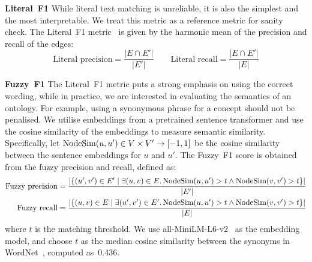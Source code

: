 \textbf{Literal~F1 }
While literal text matching is unreliable, it is also the simplest and the most interpretable. We treat this metric as a reference metric for sanity check. The Literal~F1 metric~\cite{Kashyap2005TaxaMinerAE} is given by the harmonic mean of the precision and recall of the edges:
\[
    \text{Literal precision} = \frac{|E \cap E'|}{|E'|} \qquad
    \text{Literal recall} = \frac{|E \cap E'|}{|E|}
\]

\textbf{Fuzzy~F1 }
The Literal~F1 metric puts a strong emphasis on using the correct wording, while in practice, we are interested in evaluating the semantics of an ontology. For example, using a synonymous phrase for a concept should not be penalised. We utilise embeddings from a pretrained sentence transformer \cite{reimers-2019-sentence-bert} and use the cosine similarity of the embeddings to measure semantic similarity. Specifically, let $\operatorname{NodeSim}(u, u') \in V \times V' \to [-1, 1]$ be the cosine similarity between the sentence embeddings for $u$ and $u'$. The Fuzzy~F1 score is obtained from the fuzzy precision and recall, defined as:
\begin{equation*}
    \begin{aligned}
        \text{Fuzzy precision} & = \frac{|
            \{(u', v') \in E' \mid \exists (u, v) \in E.
            \operatorname{NodeSim}(u, u') > t \land \operatorname{NodeSim}(v, v') > t
            \}
        |}{|E'|}                           \\
        \text{Fuzzy recall}    & = \frac{|
            \{(u, v) \in E \mid \exists (u', v') \in E'.
            \operatorname{NodeSim}(u, u') > t \land \operatorname{NodeSim}(v, v') > t
            \}
        |}{|E|}                            \\
    \end{aligned}
\end{equation*}
where $t$ is the matching threshold. We use all-MiniLM-L6-v2~\cite{wang2020minilm,reimers-2019-sentence-bert} as the embedding model, and choose $t$ as the median cosine similarity between the synonyms in WordNet~\cite{miller1995wordnet}, computed as~0.436.

